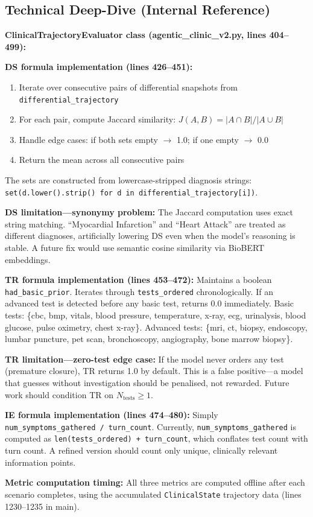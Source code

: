 \documentclass[12pt]{article}
\begin{document}
  \subsection*{Technical Deep-Dive (Internal Reference)}
  {\color{techgray}
  \textbf{ClinicalTrajectoryEvaluator class (agentic\_clinic\_v2.py, lines 404--499):}

  \textbf{DS formula implementation (lines 426--451):}
  \begin{enumerate}
    \item Iterate over consecutive pairs of differential snapshots from \texttt{differential\_trajectory}
    \item For each pair, compute Jaccard similarity: $J(A, B) = |A \cap B| / |A \cup B|$
    \item Handle edge cases: if both sets empty $\to$ 1.0; if one empty $\to$ 0.0
    \item Return the mean across all consecutive pairs
  \end{enumerate}
  The sets are constructed from lowercase-stripped diagnosis strings: \texttt{set(d.lower().strip() for d in differential\_trajectory[i])}.

  \textbf{DS limitation---synonymy problem:} The Jaccard computation uses exact string matching. ``Myocardial Infarction'' and ``Heart Attack'' are treated as different diagnoses, artificially lowering DS even when the model's reasoning is stable. A future fix would use semantic cosine similarity via BioBERT embeddings.

  \textbf{TR formula implementation (lines 453--472):} Maintains a boolean \texttt{had\_basic\_prior}. Iterates through \texttt{tests\_ordered} chronologically. If an advanced test is detected before any basic test, returns 0.0 immediately. Basic tests: \{cbc, bmp, vitals, blood pressure, temperature, x-ray, ecg, urinalysis, blood glucose, pulse oximetry, chest x-ray\}. Advanced tests: \{mri, ct, biopsy, endoscopy, lumbar puncture, pet scan, bronchoscopy, angiography, bone marrow biopsy\}.

  \textbf{TR limitation---zero-test edge case:} If the model never orders any test (premature closure), TR returns 1.0 by default. This is a false positive---a model that guesses without investigation should be penalised, not rewarded. Future work should condition TR on $N_{\text{tests}} \geq 1$.

  \textbf{IE formula implementation (lines 474--480):} Simply \texttt{num\_symptoms\_gathered / turn\_count}. Currently, \texttt{num\_symptoms\_gathered} is computed as \texttt{len(tests\_ordered) + turn\_count}, which conflates test count with turn count. A refined version should count only unique, clinically relevant information points.

  \textbf{Metric computation timing:} All three metrics are computed offline after each scenario completes, using the accumulated \texttt{ClinicalState} trajectory data (lines 1230--1235 in main).
  }
\end{document}
